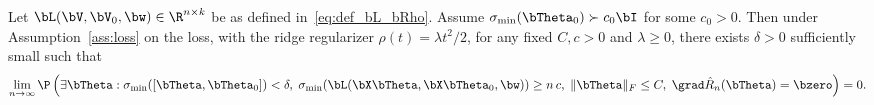 \begin{lemma}
\label{lemma:min_sv_Theta}
Let $\bL(\bV,\bV_0,\bw)\in\R^{n\times k}$ be as defined in~\eqref{eq:def_bL_bRho}.
Assume $\sigma_{\min}(\bTheta_0) \succ c_0\bI$ for some $c_0 >0$.
Then under Assumption~\ref{ass:loss} on the loss, with the ridge regularizer $\rho(t) = \lambda t^2/2$,
for any fixed $C,c>0$ and $\lambda \ge 0$, there exists $\delta >0$ sufficiently small such that
\begin{equation}
\lim_{n\to\infty}\P\left( \exists \bTheta :\sigma_{\min}([\bTheta,\bTheta_0]) < \delta,\;  \sigma_{\min}(\bL(\bX\bTheta,\bX\bTheta_0,\bw)) \ge  n\, c,\; \|\bTheta\|_F \le C,\;
\grad \hat R_n(\bTheta)  = \bzero
\right)   = 0.
\end{equation}
\end{lemma}
